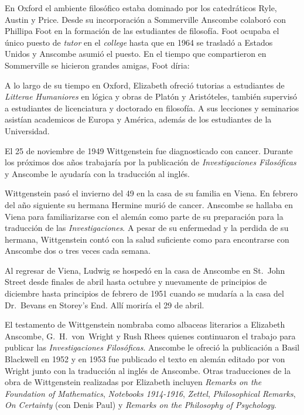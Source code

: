 En Oxford el ambiente filosófico estaba dominado por los catedráticos Ryle,
Austin y Price. Desde su incorporación a Sommerville Anscombe colaboró con
Phillipa Foot en la formación de las estudiantes de filosofía. Foot ocupaba el
único puesto de \emph{tutor} en el \emph{college} hasta que en 1964 se trasladó
a Estados Unidos y Anscombe asumió el puesto. En el tiempo que compartieron en
Sommerville se hicieron grandes amigas, Foot díria: 

A lo largo de su tiempo en Oxford, Elizabeth ofreció tutorias a estudiantes de
\emph{Litterae Humaniores} en lógica y obras de Platón y Aristóteles, también
supervisó a estudiantes de licenciatura y doctorado en filosofía. A sus
lecciones y seminarios asistían academicos de Europa y América, además de los
estudiantes de la Universidad.\autocite[cfr.~][p.~32]{teichman2002fellows}

El 25 de noviembre de 1949 Wittgenstein fue diagnosticado con
cancer\autocite[cf.~][loc 11034]{monk}. Durante los próximos dos años trabajaría
por la publicación de \emph{Investigaciones Filosóficas} y Anscombe le ayudaría
con la traducción al inglés.

Wittgenstein pasó el invierno del 49 en la casa de su familia en Viena. En
febrero del año siguiente su hermana Hermine murió de cancer. Anscombe se
hallaba en Viena para familiarizarse con el alemán como parte de su preparación
para la traducción de las \emph{Investigaciones}. A pesar de su enfermedad y la
perdida de su hermana, Wittgenstein contó con la salud suficiente como para
encontrarse con Anscombe dos o tres veces cada semana.\autocite[cf.~][loc
11138]{monk}

Al regresar de Viena, Ludwig se hospedó en la casa de Anscombe en St.~John
Street desde finales de abril hasta octubre y nuevamente de principios de
diciembre hasta principios de febrero de 1951 cuando se mudaría a la casa del
Dr.~Bevans en Storey's End.\autocite[cf.~][loc. 11242]{monk} Allí moriría el 29
de abril.

El testamento de Wittgenstein nombraba como albaceas literarios a Elizabeth
Anscombe, G.~H.~von~Wright y Rush Rhees quienes continuaron el trabajo para
publicar las \emph{Investigaciones Filosóficas}. Anscombe le ofreció la
publicación a Basil Blackwell en 1952 y en 1953 fue publicado el texto en alemán
editado por von Wright junto con la traducción al inglés de Anscombe. Otras
traducciones de la obra de Wittgenstein realizadas por Elizabeth incluyen
\emph{Remarks on the Foundation of Mathematics}, \emph{Notebooks 1914-1916},
\emph{Zettel}, \emph{Philosophical Remarks}, \emph{On Certainty} (con Denis
Paul) y \emph{Remarks on the Philosophy of
  Psychology}.\autocite[cfr.~][p.~38]{teichman2002fellows}

